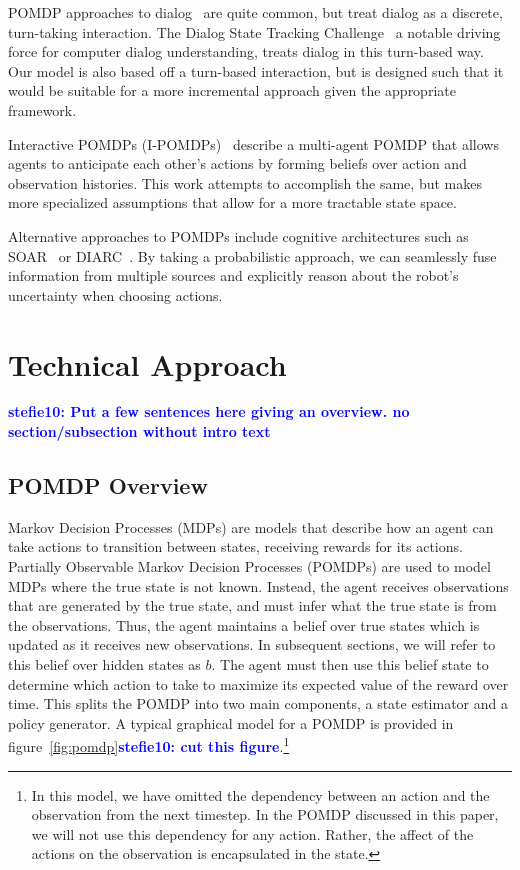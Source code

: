 \documentclass[conference]{IEEEtran}
\newcommand{\stnote}[1]{\textcolor{blue}{\textbf{stefie10: #1}}}
\begin{document}
POMDP approaches to dialog~\citep{young13} are quite common, but treat dialog
as a discrete, turn-taking interaction. The Dialog State Tracking
Challenge~\citep{williams2013dialog} a notable driving force for computer
dialog understanding, treats dialog in this turn-based way. Our model is also based off a turn-based interaction, but is designed such that it would be suitable for a more incremental approach given the appropriate framework. 

Interactive POMDPs (I-POMDPs)~\citep{gmytrasiewicz2005framework} describe a multi-agent POMDP that allows agents to anticipate each other's actions by forming beliefs over action and observation histories. This work attempts to accomplish the same, but makes more specialized assumptions that allow for a more tractable state space. 

Alternative approaches to
POMDPs include cognitive architectures such as SOAR~\citep{soar} or
DIARC~\citep{diarc}.  By taking a probabilistic approach, we can seamlessly
fuse information from multiple sources and explicitly reason about the
robot's uncertainty when choosing actions.
\section{Technical Approach}

\stnote{Put a few sentences here giving an overview.  no section/subsection without intro text}

\subsection{POMDP Overview}

Markov Decision Processes (MDPs) are models that describe how an agent can take actions to transition between states, receiving rewards for its actions. Partially Observable Markov Decision Processes (POMDPs) are used to model MDPs where the true state is not known. Instead, the agent receives observations that are generated by the true state, and must infer what the true state is from the observations. Thus, the agent maintains a belief over true states which is updated as it receives new observations. In subsequent sections, we will refer to this belief over hidden states as $b$. The agent must then use this belief state to determine which action to take to maximize its expected value of the reward over time. This splits the POMDP into two main components, a state estimator and a policy generator. A typical graphical model for a POMDP is provided in figure~\ref{fig:pomdp}\stnote{cut this figure}.\footnote{In this model, we have omitted the dependency between an action and the observation from the next timestep. In the POMDP discussed in this paper, we will not use this dependency for any action. Rather, the affect of the actions on the observation is encapsulated in the state.}
\end{document}

